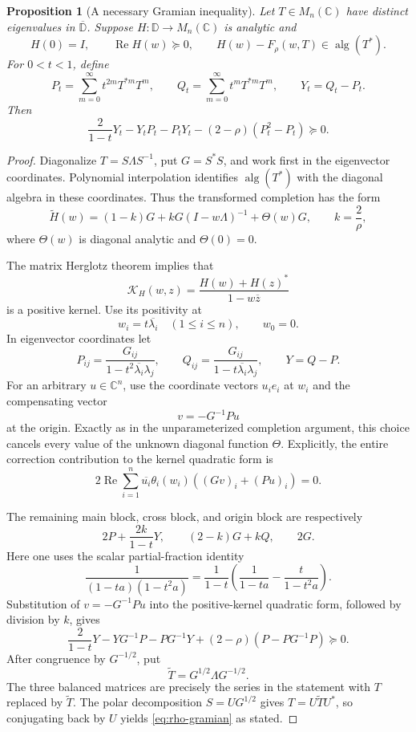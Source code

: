 \documentclass[11pt]{article}
\newtheorem{proposition}[theorem]{Proposition}
\theoremstyle{remark}
\newcommand{\C}{\mathbb C}
\newcommand{\D}{\mathbb D}
\newcommand{\alg}{\operatorname{alg}}
\newcommand{\RePart}{\operatorname{Re}}
\begin{document}
\begin{proposition}[A necessary Gramian inequality]
\label{prop:rho-gramian}
Let \(T\in M_n(\C)\) have distinct eigenvalues in
\(\overline{\D}\).  Suppose \(H:\D\to M_n(\C)\) is analytic and
\[
 H(0)=I,\qquad \RePart H(w)\succeq0,
\qquad
 H(w)-F_\rho(w,T)\in\alg(T^*) .
\]
For \(0<t<1\), define
\[
 P_t=\sum_{m=0}^\infty t^{2m}T^{*m}T^m,\qquad
 Q_t=\sum_{m=0}^\infty t^mT^{*m}T^m,\qquad
 Y_t=Q_t-P_t.
\]
Then
\begin{equation}
\label{eq:rho-gramian}
 \frac2{1-t}Y_t-Y_tP_t-P_tY_t
 -(2-\rho)(P_t^2-P_t)\succeq0 .
\end{equation}
\end{proposition}

\begin{proof}
Diagonalize \(T=S\Lambda S^{-1}\), put \(G=S^*S\), and work first in
the eigenvector coordinates.  Polynomial interpolation identifies
\(\alg(T^*)\) with the diagonal algebra in these coordinates.  Thus
the transformed completion has the form
\[
 \widetilde H(w)
 =
 (1-k)G+kG(I-w\Lambda)^{-1}+\Theta(w)G,
 \qquad k=\frac2\rho,
\]
where \(\Theta(w)\) is diagonal analytic and \(\Theta(0)=0\).

The matrix Herglotz theorem implies that
\[
 \mathcal K_H(w,z)=\frac{H(w)+H(z)^*}{1-w\overline z}
\]
is a positive kernel.  Use its positivity at
\[
 w_i=t\overline{\lambda_i}\quad(1\leq i\leq n),
 \qquad w_0=0.
\]
In eigenvector coordinates let
\[
 P_{ij}=\frac{G_{ij}}{1-t^2\overline{\lambda_i}\lambda_j},
 \qquad
 Q_{ij}=\frac{G_{ij}}{1-t\overline{\lambda_i}\lambda_j},
 \qquad Y=Q-P.
\]
For an arbitrary \(u\in\C^n\), use the coordinate vectors
\(u_ie_i\) at \(w_i\) and the compensating vector
\[
 v=-G^{-1}Pu
\]
at the origin.  Exactly as in the unparameterized completion
argument, this choice cancels every value of the unknown diagonal
function \(\Theta\).  Explicitly, the entire correction contribution
to the kernel quadratic form is
\[
 2\RePart\sum_{i=1}^n
 \overline{u_i}\theta_i(w_i)
 \left((Gv)_i+(Pu)_i\right)=0.
\]

The remaining main block, cross block, and origin block are
respectively
\[
 2P+\frac{2k}{1-t}Y,\qquad
 (2-k)G+kQ,\qquad 2G.
\]
Here one uses the scalar partial-fraction identity
\[
 \frac1{(1-ta)(1-t^2a)}
 =
 \frac1{1-t}\left(\frac1{1-ta}
 -\frac{t}{1-t^2a}\right).
\]
Substitution of \(v=-G^{-1}Pu\) into the positive-kernel quadratic
form, followed by division by \(k\), gives
\[
 \frac2{1-t}Y-YG^{-1}P-PG^{-1}Y
 +(2-\rho)(P-PG^{-1}P)\succeq0.
\]
After congruence by \(G^{-1/2}\), put
\[
 \widetilde T=G^{1/2}\Lambda G^{-1/2}.
\]
The three balanced matrices are precisely the series in the
statement with \(T\) replaced by \(\widetilde T\).  The polar
decomposition \(S=UG^{1/2}\) gives
\(T=U\widetilde T U^*\), so conjugating back by \(U\) yields
\eqref{eq:rho-gramian} as stated.
\end{proof}
\end{document}
